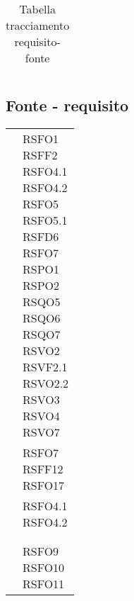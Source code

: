 {{{{{\begin{center}
\begin{longtable}{|p{7.5cm}|p{7.5cm}|}
		\caption[Tabella tracciamento requisito-fonte]{Tabella tracciamento requisito-fonte}\label{4.5}\\
	\end{longtable}
\end{center}
\clearpage
\subsection{Fonte - requisito}\label{RequisitiTracciamentoDeiRequisitiFonteRequisito}
\def\tabularxcolumn#1{m{#1}}
{
	\begin{center}
		\renewcommand{\arraystretch}{1.4}
		\begin{longtable}{|p{7.5cm}|p{7.5cm}|}
		\hline
		\rowcolor{airforceblue}
		\makecell[c]{\textbf{Fonte}} & \makecell[c]{\textbf{Codice RS}}  \\
		\hline
		\makecell[c]{Capitolato$_{\scaleto{G}{3pt}}$} & \makecell[c]{RSFO1\\RSFF2\\RSFO4.1\\RSFO4.2\\RSFO5\\RSFO5.1\\RSFD6\\RSFO7\\RSPO1\\RSPO2\\RSQO5\\RSQO6\\RSQO7\\RSVO2\\RSVF2.1\\RSVO2.2\\RSVO3\\RSVO4\\RSVO7} \\
		\hline
		\makecell[c]{UC1} & \makecell[c]{RSFO7 \\ RSFF12 \\ RSFO17} \\
		\hline
		\makecell[c]{UC2} & \makecell[c]{RSFO4.1 \\ RSFO4.2 } \\
		\hline
		\makecell[c]{UC3} & \makecell[c]{RSVO3.1 } \\ %
		\hline
		\makecell[c]{UC4} & \makecell[c]{RSFO20 } \\
		\hline
		\makecell[c]{UC5} & \makecell[c]{RSFO9 \\ RSFO10 \\ RSFO11} \\

\end{longtable}
\end{center}}}}}}}

